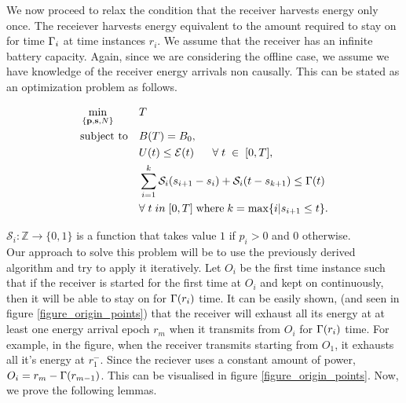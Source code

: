 
We now proceed to relax the condition that the receiver harvests energy only once. The receiever harvests energy equivalent to the amount required to stay on for time $\Gamma_i$ at time instances $r_i$. 
We assume that the receiver has an infinite battery capacity. 
Again, since we are considering the offline case, we assume we have knowledge of the receiver energy arrivals non causally. This can be stated as an optimization problem as follows.\\
\begin{problem}
\begin{align}
&\min_{\{\textbf{p},\textbf{s},N\}}			&& T
\\
&\text{subject to} 				&& B(T)=B_0, 
\label{pb2_constraint_bits}
\\
&     										&& U(t)\le \mathcal{E}(t)  		\;\;\;\;\;\; \forall \; t\;\in\;[0,T], \label{pb2_constraint_energy}
\\
&    										&& \displaystyle \sum_{i=1}^k \mathcal{S}_i(s_{i+1} - s_i) + \mathcal{S}_i(t - s_{k+1}) \leq \TRx(t) \\ &&&\forall \; t \; in \; [0,T] \; \text{where} \; k = \max\{i| s_{i+1} \leq t\}.
\label{pb2_constraint_time}
\end{align}
\end{problem}
$\mathcal{S}_i:\mathbb{Z}\rightarrow\{0,1\}$ is a function that takes value $1$ if $p_i>0$ and $0$ otherwise.\\
Our approach to solve this problem will be to use the previously derived algorithm and try to apply it iteratively. Let $O_i$ be the first time instance such that if the receiver is started for the first time at $O_i$ and kept on continuously, then it will be able to stay on for $\Gamma(r_i)$ time. It can be easily shown, (and seen in figure \ref{figure_origin_points}) that the receiver will exhaust all its energy at at least one energy arrival epoch $r_m$ when it transmits from $O_i$ for $\Gamma(r_i)$ time. For example, in the figure, when the receiver transmits starting from $O_1$, it exhausts all it's energy at $r_1^-$. Since the reciever uses a constant amount of power, $O_i = r_m - \Gamma(r_{m-1})$. This can be visualised in figure \ref{figure_origin_points}. Now, we prove the following lemmas.\\

